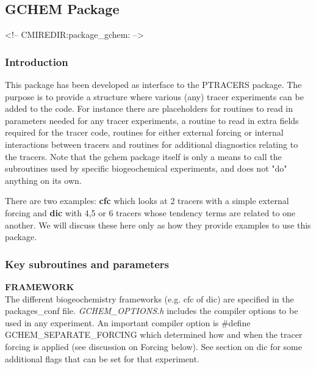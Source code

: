 \subsection {GCHEM Package} 
\label{sec:pkg:gchem}
\begin{rawhtml}
<!-- CMIREDIR:package_gchem: -->
\end{rawhtml}

\subsubsection {Introduction}
This package has been developed as interface to the PTRACERS package.
The purpose is to provide a structure where various (any)
tracer experiments can be added to the code.
For instance there are placeholders for routines
to read in parameters needed for any tracer experiments, a routine
to read in extra fields required for the tracer code, routines
for either external forcing or internal interactions between tracers
and routines for additional diagnostics relating to the tracers.
Note that the gchem package itself is only a means to call
the subroutines used by specific biogeochemical experiments,
and does not "do" anything on its own.

There are two examples: {\bf cfc} which looks at 2 tracers with a
simple external forcing and {\bf dic} with 4,5 or 6 tracers 
whose tendency terms
are related to one another. We will discuss these here only as
how they provide examples to use this package.


\subsubsection {Key subroutines and parameters}

\noindent
{{\bf FRAMEWORK}} \\
The different biogeochemistry frameworks (e.g. cfc of dic)
are specified in the packages\_conf file.
{\it GCHEM\_OPTIONS.h} includes the compiler options to be used
in any experiment. 
An important compiler option is
 \#define GCHEM\_SEPARATE\_FORCING which determined 
how and when the tracer forcing is applied (see discussion
on Forcing below). See section on dic for some additional
flags that can be set for that experiment.
\\

